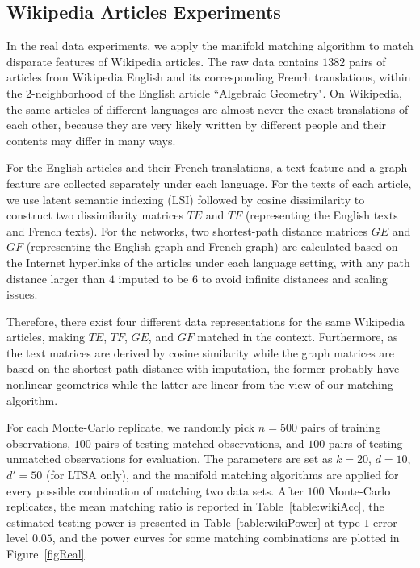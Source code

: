 \documentclass[times,twocolumn,final]{elsarticle}
\begin{document}
\subsection{Wikipedia Articles Experiments}
In the real data experiments, we apply the manifold matching algorithm to match disparate features of Wikipedia articles. The raw data contains $1382$ pairs of articles from Wikipedia English and its corresponding French translations, within the 2-neighborhood of the English article ``Algebraic Geometry". On Wikipedia, the same articles of different languages are almost never the exact translations of each other, because they are very likely written by different people and their contents may differ in many ways.

For the English articles and their French translations, a text feature and a graph feature are collected separately under each language. For the texts of each article, we use latent semantic indexing (LSI) \citep{DeerwesterDumais1990} followed by cosine dissimilarity to construct two dissimilarity matrices $TE$ and $TF$ (representing the English texts and French texts). For the networks, two shortest-path distance matrices $GE$ and $GF$ (representing the English graph and French graph) are calculated based on the Internet hyperlinks of the articles under each language setting, with any path distance larger than $4$ imputed to be $6$ to avoid infinite distances and scaling issues.

Therefore, there exist four different data representations for the same Wikipedia articles, making $TE$, $TF$, $GE$, and $GF$ matched in the context. Furthermore, as the text matrices are derived by cosine similarity while the graph matrices are based on the shortest-path distance with imputation, the former probably have nonlinear geometries while the latter are linear from the view of our matching algorithm.

For each Monte-Carlo replicate, we randomly pick $n=500$ pairs of training observations, $100$ pairs of testing matched observations, and $100$ pairs of testing unmatched observations for evaluation. The parameters are set as $k=20$, $d=10$, $d'=50$ (for LTSA only), and the manifold matching algorithms are applied for every possible combination of matching two data sets. After $100$ Monte-Carlo replicates, the mean matching ratio is reported in Table~\ref{table:wikiAcc}, the estimated testing power is presented in Table~\ref{table:wikiPower} at type $1$ error level $0.05$, and the power curves for some matching combinations are plotted in Figure~\ref{figReal}. 
%
%
%
%
%
\end{document}
